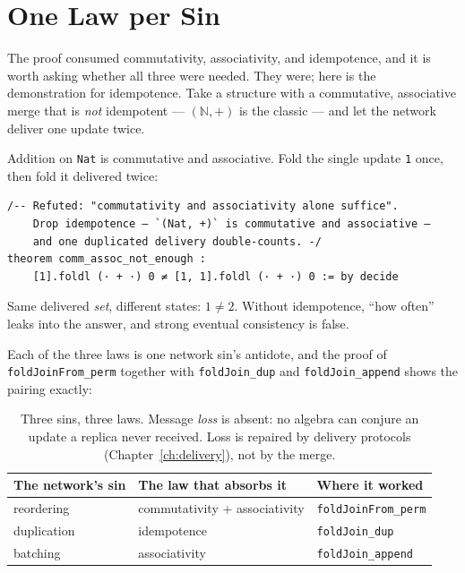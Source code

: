 \documentclass[12pt, a4paper, openright]{book}
\theoremstyle{thmstyle}
\theoremstyle{defstyle}
\newcommand{\lc}[1]{\texttt{#1}}
\newcounter{refutation}[chapter]
\renewcommand{\therefutation}{\thechapter.\arabic{refutation}}
\newenvironment{refutedbox}[1]{%
  \refstepcounter{refutation}%
  \begin{tcolorbox}[refutedbox,
    title={Refuted \therefutation\ --- #1}]%
}{\end{tcolorbox}}
\begin{document}
\section{One Law per Sin}

The proof consumed commutativity, associativity, and idempotence, and it
is worth asking whether all three were needed. They were; here is the
demonstration for idempotence. Take a structure with a commutative,
associative merge that is \emph{not} idempotent --- $(\mathbb{N}, +)$ is
the classic --- and let the network deliver one update twice.

\begin{refutedbox}{Commutativity and associativity alone suffice}
  \label{ref:comm-assoc-not-enough}
  Addition on \lc{Nat} is commutative and associative. Fold the single
  update \lc{1} once, then fold it delivered twice:
\begin{verbatim}
/-- Refuted: "commutativity and associativity alone suffice".
    Drop idempotence — `(Nat, +)` is commutative and associative —
    and one duplicated delivery double-counts. -/
theorem comm_assoc_not_enough :
    [1].foldl (· + ·) 0 ≠ [1, 1].foldl (· + ·) 0 := by decide
\end{verbatim}
  Same delivered \emph{set}, different states: $1 \neq 2$. Without
  idempotence, ``how often'' leaks into the answer, and strong eventual
  consistency is false.
\end{refutedbox}

Each of the three laws is one network sin's antidote, and the proof of
\lc{foldJoinFrom_perm} together with \lc{foldJoin_dup} and
\lc{foldJoin_append} shows the pairing exactly:

\begin{table}[h]
  \centering
  \begin{tabular}{lll}
    \toprule
    The network's sin & The law that absorbs it & Where it worked \\
    \midrule
    reordering   & commutativity + associativity & \lc{foldJoinFrom_perm} \\
    duplication  & idempotence                   & \lc{foldJoin_dup} \\
    batching     & associativity                 & \lc{foldJoin_append} \\
    \bottomrule
  \end{tabular}
  \caption{Three sins, three laws. Message \emph{loss} is absent: no
    algebra can conjure an update a replica never received. Loss is
    repaired by delivery protocols (Chapter~\ref{ch:delivery}), not by
    the merge.}
\end{table}
\end{document}
